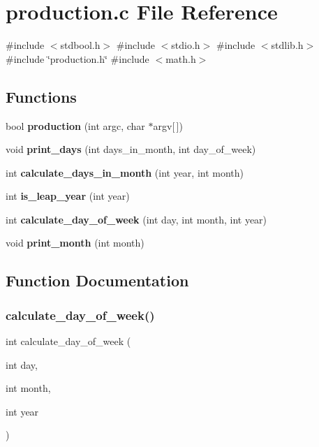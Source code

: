 \section{production.\+c File Reference}
\label{production_8c}
{\ttfamily \#include $<$stdbool.\+h$>$}\newline
{\ttfamily \#include $<$stdio.\+h$>$}\newline
{\ttfamily \#include $<$stdlib.\+h$>$}\newline
{\ttfamily \#include \char`\"{}production.\+h\char`\"{}}\newline
{\ttfamily \#include $<$math.\+h$>$}\newline
\subsection*{Functions}
\begin{DoxyCompactItemize}
\item 
bool \textbf{ production} (int argc, char $\ast$argv[$\,$])
\item 
void \textbf{ print\+\_\+days} (int days\+\_\+in\+\_\+month, int day\+\_\+of\+\_\+week)
\item 
int \textbf{ calculate\+\_\+days\+\_\+in\+\_\+month} (int year, int month)
\item 
int \textbf{ is\+\_\+leap\+\_\+year} (int year)
\item 
int \textbf{ calculate\+\_\+day\+\_\+of\+\_\+week} (int day, int month, int year)
\item 
void \textbf{ print\+\_\+month} (int month)
\end{DoxyCompactItemize}


\subsection{Function Documentation}
\mbox{\label{production_8c_a366627f8be4bdb2683a04ca7254d9a2c}} 
\subsubsection{calculate\+\_\+day\+\_\+of\+\_\+week()}
{\footnotesize\ttfamily int calculate\+\_\+day\+\_\+of\+\_\+week (\begin{DoxyParamCaption}\item[{int}]{day,  }\item[{int}]{month,  }\item[{int}]{year }\end{DoxyParamCaption})}

